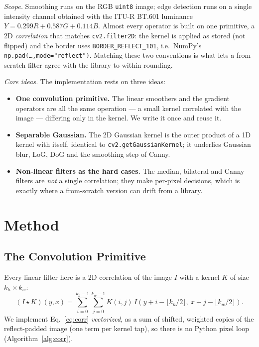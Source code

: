 \documentclass[a4paper,11pt]{article}
\newcommand{\runin}[1]{\par\medskip\noindent\textit{#1}\hspace{0.4em}\ignorespaces}
\begin{document}
\runin{Scope.} Smoothing runs on the RGB \texttt{uint8} image; edge detection runs
on a single intensity channel obtained with the ITU-R BT.601 luminance
$Y=0.299R+0.587G+0.114B$. Almost every operator is built on one primitive, a 2D
\emph{correlation} that matches \texttt{cv2.filter2D}: the kernel is applied as
stored (not flipped) and the border uses \texttt{BORDER\_REFLECT\_101}, i.e.\
NumPy's \texttt{np.pad(\dots,mode="reflect")}. Matching these two conventions is
what lets a from-scratch filter agree with the library to within rounding.

\runin{Core ideas.} The implementation rests on three ideas:
\begin{itemize}[nosep,leftmargin=1.4em]
  \item \textbf{One convolution primitive.} The linear smoothers and the gradient
        operators are all the same operation --- a small kernel correlated with the
        image --- differing only in the kernel. We write it once and reuse it.
  \item \textbf{Separable Gaussian.} The 2D Gaussian kernel is the outer product of
        a 1D kernel with itself, identical to \texttt{cv2.getGaussianKernel}; it
        underlies Gaussian blur, LoG, DoG and the smoothing step of Canny.
  \item \textbf{Non-linear filters as the hard cases.} The median, bilateral and
        Canny filters are \emph{not} a single correlation; they make per-pixel
        decisions, which is exactly where a from-scratch version can drift from a
        library.
\end{itemize}

\section{Method}

\subsection{The Convolution Primitive}
Every linear filter here is a 2D correlation of the image $I$ with a kernel $K$ of
size $k_h\times k_w$:
\begin{equation}
(I\star K)(y,x)=\sum_{i=0}^{k_h-1}\sum_{j=0}^{k_w-1}
K(i,j)\,I\!\left(y+i-\lfloor k_h/2\rfloor,\ x+j-\lfloor k_w/2\rfloor\right).
\label{eq:corr}
\end{equation}
We implement Eq.~\eqref{eq:corr} \emph{vectorized}, as a sum of shifted, weighted
copies of the reflect-padded image (one term per kernel tap), so there is no Python
pixel loop (Algorithm~\ref{alg:corr}).
\end{document}
